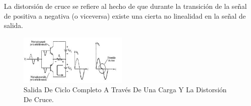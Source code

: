 \documentclass[10pt,a4paper]{article}
\begin{document}
La distorsión de cruce se refiere al hecho de que durante la transición de la señal de positiva a negativa (o viceversa) existe una cierta no linealidad en la señal de salida.\\
\begin{center}
\begin{figure}[hbtp]
\centering
\includegraphics[scale=0.5]{23.png}
\caption{Salida De Ciclo Completo A Través De Una Carga Y La Distorsión De Cruce.}
\end{figure}
\end{center}
\end{document}
